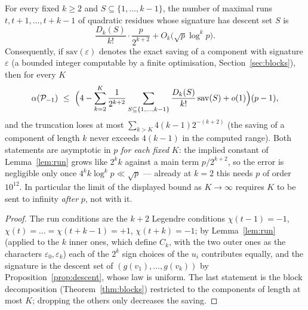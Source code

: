 \begin{corollary}\label{cor:rundensity}
For every fixed $k\ge2$ and $S\subseteq\{1,\dots,k-1\}$, the number of maximal runs $t,t+1,\dots,t+k-1$ of quadratic residues whose
signature has descent set $S$ is
\[
 \frac{D_k(S)}{k!}\cdot\frac p{2^{k+2}}+O_k\bigl(\sqrt p\log^kp\bigr).
\]
Consequently, if $\mathrm{sav}(\varepsilon)$ denotes the exact saving of a component with signature $\varepsilon$ (a bounded integer computable
by a finite optimisation, Section~\ref{sec:blocks}), then for every $K$
\[
 \alpha(\Pset_{-1})\ \le\ \Bigl(4-\sum_{k=2}^{K}\frac1{2^{k+2}}\sum_{S\subseteq\{1,\dots,k-1\}}\frac{D_k(S)}{k!}\,\mathrm{sav}(S)+o(1)\Bigr)(p-1),
\]
and the truncation loses at most $\sum_{k>K}4(k-1)2^{-(k+2)}$ (the saving of a component of length $k$ never exceeds $4(k-1)$ in the computed range).
Both statements are asymptotic in $p$ \emph{for each fixed} $K$: the implied constant of Lemma~\ref{lem:run} grows like $2^kk$ against a main term
$p/2^{k+2}$, so the error is negligible only once $4^kk\log^kp\ll\sqrt p$ --- already at $k=2$ this needs $p$ of order $10^{12}$.  In particular the
limit of the displayed bound as $K\to\infty$ requires $K$ to be sent to infinity \emph{after} $p$, not with it.
\end{corollary}
\begin{proof}
The run conditions are the $k+2$ Legendre conditions $\chi(t-1)=-1$, $\chi(t)=\dots=\chi(t+k-1)=+1$, $\chi(t+k)=-1$; by Lemma~\ref{lem:run}
(applied to the $k$ inner ones, which define $C_k$, with the two outer ones as the characters $\varepsilon_0,\varepsilon_k$) each of the $2^k$
sign choices of the $u_i$ contributes equally, and the signature is the descent set of $(g(v_1),\dots,g(v_k))$ by
Proposition~\ref{prop:descent}, whose law is uniform.  The last statement is the block decomposition (Theorem~\ref{thm:blocks}) restricted
to the components of length at most $K$; dropping the others only decreases the saving.
\end{proof}

